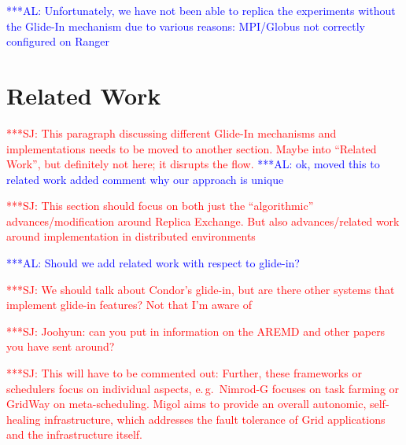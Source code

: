 \documentclass{rspublic}
\newcommand{\alnote}[1]{ {\textcolor{blue} { ***AL: #1 }}}
\newcommand{\jhanote}[1]{ {\textcolor{red} { ***SJ: #1 }}}
\newcommand{\alnote}[1]{}
\newcommand{\jhanote}[1]{}
\begin{document}
\alnote{Unfortunately, we have not been able to replica the
  experiments without the Glide-In mechanism due to various reasons:
  MPI/Globus not correctly configured on Ranger}


\section{Related Work}

\jhanote{This paragraph discussing different Glide-In mechanisms and
  implementations needs to be moved to another section. Maybe into
  ``Related Work'', but definitely not here; it disrupts the flow.}
\alnote{ok, moved this to related work added comment why our approach is unique}

\jhanote{This section should focus on both just the ``algorithmic''
  advances/modification around Replica Exchange. But also
  advances/related work around  implementation in distributed
  environments}
                       
\alnote{Should we add related work with respect to glide-in?}

\jhanote{We should talk about Condor's glide-in, but are there other
  systems that implement glide-in features? Not that I'm aware of}

\jhanote{Joohyun: can you put in information on the AREMD and other
  papers you have sent around?}


                                 
\jhanote{This will have to be commented out: Further, these frameworks
  or schedulers focus on individual aspects, e.\,g.\ Nimrod-G focuses
  on task farming or GridWay on meta-scheduling. Migol aims to provide
  an overall autonomic, self-healing infrastructure, which addresses
  the fault tolerance of Grid applications and the infrastructure
  itself.}
\end{document}
